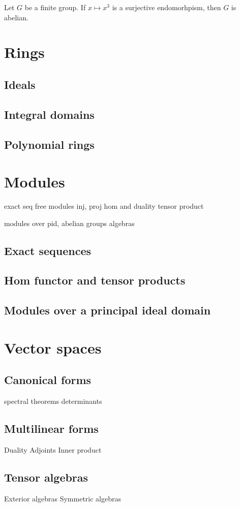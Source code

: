 \documentclass{../note}
\begin{document}
\begin{prb}
Let $G$ be a finite group.
If $x\mapsto x^3$ is a surjective endomorhpism, then $G$ is abelian.
\end{prb}



\part{Rings}
\chapter{Ideals}
\chapter{Integral domains}
\chapter{Polynomial rings}

\part{Modules}
exact seq
free modules
inj, proj
hom and duality
tensor product

modules over pid, abelian groups
algebras
\chapter{Exact sequences}
\chapter{Hom functor and tensor products}
\chapter{Modules over a principal ideal domain}





\part{Vector spaces}
\chapter{Canonical forms}
spectral theorems
determinants

\chapter{Multilinear forms}
Duality
Adjoints
Inner product

\chapter{Tensor algebras}
Exterior algebras
Symmetric algebras
\end{document}
